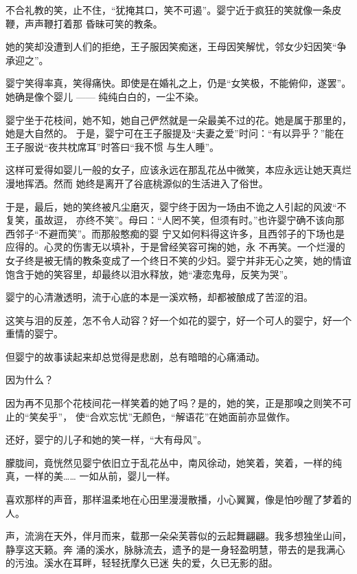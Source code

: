 		不合礼教的笑，止不住，“犹掩其口，笑不可遏”。婴宁近于疯狂的笑就像一条皮鞭，声声鞭打着那
	昏昧可笑的教条。

		她的笑却没遭到人们的拒绝，王子服因笑痴迷，王母因笑解忧，邻女少妇因笑“争承迎之”。

		婴宁笑得率真，笑得痛快。即使是在婚礼之上，仍是“女笑极，不能俯仰，遂罢”。她确是像个婴儿
	—— 纯纯白白的，一尘不染。

		婴宁坐于花枝间，她不知，她自己俨然就是一朵最美不过的花。她是属于那里的，她是大自然的。
	于是，婴宁可在王子服提及“夫妻之爱”时问：“有以异乎？”能在王子服说“夜共枕席耳”时答曰“我不惯
	与生人睡”。

		这样可爱得如婴儿一般的女子，应该永远在那乱花丛中微笑，本应永远让她天真烂漫地挥洒。然而
	她终是离开了谷底桃源似的生活进入了俗世。

		于是，最后，她的笑终被凡尘磨灭，婴宁终于因为一场由不诡之人引起的风波“不复笑，虽故逗，
	亦终不笑”。母曰：“人罔不笑，但须有时。”也许婴宁确不该向那西邻子“不避而笑”。而那般憨痴的婴
	宁又如何料得这许多，且西邻子的下场也是应得的。心灵的伤害无以填补，于是曾经笑容可掬的她，永
	不再笑。一个烂漫的女子终是被无情的教条变成了一个终日不笑的少妇。婴宁并非无心之笑，她的情谊
	饱含于她的笑容里，却最终以泪水释放，她“凄恋鬼母，反笑为哭”。

		婴宁的心清澈透明，流于心底的本是一溪欢畅，却都被酿成了苦涩的泪。

		这笑与泪的反差，怎不令人动容？好一个如花的婴宁，好一个可人的婴宁，好一个重情的婴宁。

		但婴宁的故事读起来却总觉得是悲剧，总有暗暗的心痛涌动。

		因为什么？

		因为再不见那个花枝间花一样笑着的她了吗？是的，她的笑，正是那嗅之则笑不可止的“笑矣乎”，
	使“合欢忘忧”无颜色，“解语花”在她面前亦显做作。

		还好，婴宁的儿子和她的笑一样，“大有母风”。

		朦胧间，竟恍然见婴宁依旧立于乱花丛中，南风徐动，她笑着，笑着，一样的纯真，一样的美……
	一如从前，婴儿一样。

	\endwriting



		喜欢那样的声音，那样温柔地在心田里漫漫散播，小心翼翼，像是怕吵醒了梦着的人。

		声，流淌在天外，伴月而来，载那一朵朵芙蓉似的云起舞翩翩。我多想独坐山间，静享这天籁。奔
	涌的溪水，脉脉流去，遗予的是一身轻盈明慧，带去的是我满心的污浊。溪水在耳畔，轻轻抚摩久已迷
	失的爱，久已无影的甜。

